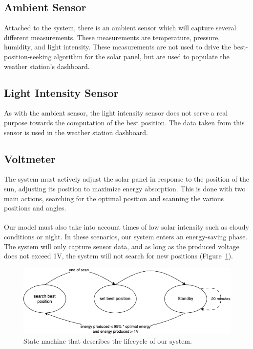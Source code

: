 \subsection*{Ambient Sensor}
Attached to the system, there is an ambient sensor which will capture several different measurements.
These measurements are temperature, pressure, humidity, and light intensity.
These measurements are not used to drive the best-position-seeking algorithm for the solar panel, but are used to populate the weather station's dashboard.

\subsection*{Light Intensity Sensor}
As with the ambient sensor, the light intensity sensor does not serve a real purpose towards the computation of the best position.
The data taken from this sensor is used in the weather station dashboard.

\subsection*{Voltmeter}

The system must actively adjust the solar panel in response to the position of the sun, adjusting its position to maximize energy absorption.
This is done with two main actions, searching for the optimal position and scanning the various positions and angles. \\ \\
Our model must also take into account times of low solar intensity such as cloudy conditions or night.
In these scenarios, our system enters an energy-saving phase.
The system will only capture sensor data, and as long as the produced voltage does not exceed 1V, the system will not search for new positions (Figure~\ref{fig:seros-sm}).
\begin{figure}[h]
    \centering
    \includegraphics[width=12cm]{../assets/png/servos-state-machine}
    \caption{State machine that describes the lifecycle of our system.}
    \label{fig:seros-sm}
\end{figure}
